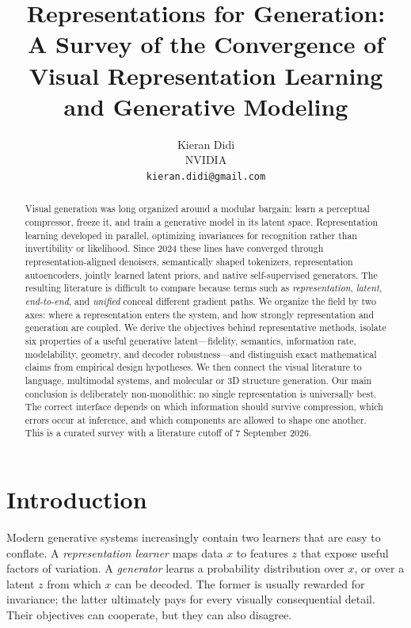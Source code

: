 \documentclass{article}
\title{Representations for Generation:\\
A Survey of the Convergence of Visual Representation Learning and Generative Modeling}
\author{%
  Kieran Didi\\
  NVIDIA\\
  \texttt{kieran.didi@gmail.com}
}
\begin{document}
\maketitle

\begin{abstract}
Visual generation was long organized around a modular bargain: learn a perceptual compressor, freeze it, and train a generative model in its latent space. Representation learning developed in parallel, optimizing invariances for recognition rather than invertibility or likelihood. Since 2024 these lines have converged through representation-aligned denoisers, semantically shaped tokenizers, representation autoencoders, jointly learned latent priors, and native self-supervised generators. The resulting literature is difficult to compare because terms such as \emph{representation}, \emph{latent}, \emph{end-to-end}, and \emph{unified} conceal different gradient paths. We organize the field by two axes: where a representation enters the system, and how strongly representation and generation are coupled. We derive the objectives behind representative methods, isolate six properties of a useful generative latent---fidelity, semantics, information rate, modelability, geometry, and decoder robustness---and distinguish exact mathematical claims from empirical design hypotheses. We then connect the visual literature to language, multimodal systems, and molecular or 3D structure generation. Our main conclusion is deliberately non-monolithic: no single representation is universally best. The correct interface depends on which information should survive compression, which errors occur at inference, and which components are allowed to shape one another. This is a curated survey with a literature cutoff of 7 September 2026.
\end{abstract}

\section{Introduction}

Modern generative systems increasingly contain two learners that are easy to conflate. A \emph{representation learner} maps data \(x\) to features \(z\) that expose useful factors of variation. A \emph{generator} learns a probability distribution over \(x\), or over a latent \(z\) from which \(x\) can be decoded. The former is usually rewarded for invariance; the latter ultimately pays for every visually consequential detail. Their objectives can cooperate, but they can also disagree.
\end{document}
